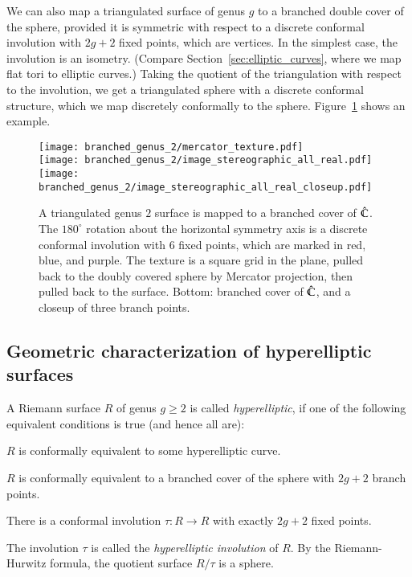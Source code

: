 \documentclass[Thesis]{subfiles}
\begin{document}
 We
can also map a triangulated surface of genus $g$ to a branched double
cover of the sphere, provided it is symmetric with respect to a
discrete conformal involution with $2g+2$ fixed points, which are
vertices. In the simplest case, the involution is an
isometry. (Compare Section~\ref{sec:elliptic_curves}, where we map
flat tori to elliptic curves.) Taking the quotient of the triangulation
with respect to the involution, we get a triangulated sphere with a
discrete conformal structure, which we map discretely conformally to
the sphere.  Figure~\ref{fig:genus2_branched} shows an example.
\begin{figure} 
\centering
\texttt{[image: branched\_genus\_2/mercator\_texture.pdf]}\\
\texttt{[image: branched\_genus\_2/image\_stereographic\_all\_real.pdf]}%
\quad%
\texttt{[image: branched\_genus\_2/image\_stereographic\_all\_real\_closeup.pdf]}\\
\caption{A triangulated genus $2$ surface is mapped to a branched
  cover of $\hat{\mathbb C}$. The $180^{\circ}$ rotation about the horizontal
  symmetry axis is a discrete conformal involution with $6$ fixed
  points, which are marked in red, blue, and purple. The texture is a
  square grid in the plane, pulled back to the doubly covered sphere
  by Mercator projection, then pulled back to the surface. Bottom:
  branched cover of $\hat{\mathbb C}$, and a closeup of three branch points.}
\label{fig:genus2_branched} 
\end{figure}

\subsection{Geometric characterization of hyperelliptic surfaces}
\label{sec:hyperelliptic_domain}

A Riemann surface $R$ of genus $g\geq 2$ is called \emph{hyperelliptic},
if one of the following equivalent conditions is true (and hence all are):
\begin{compactenum}[(i)]
\item $R$ is conformally equivalent to some hyperelliptic curve.
\item $R$ is conformally equivalent to a branched cover of the sphere
  with $2g+2$ branch points.
\item There is a conformal involution $\tau:R\rightarrow R$ with
  exactly $2g+2$ fixed points. 
\end{compactenum}
The involution $\tau$ is called the \emph{hyperelliptic involution} of
$R$. By the Riemann-Hurwitz formula, the quotient surface $R/\tau$ is a
sphere. 
\end{document}
